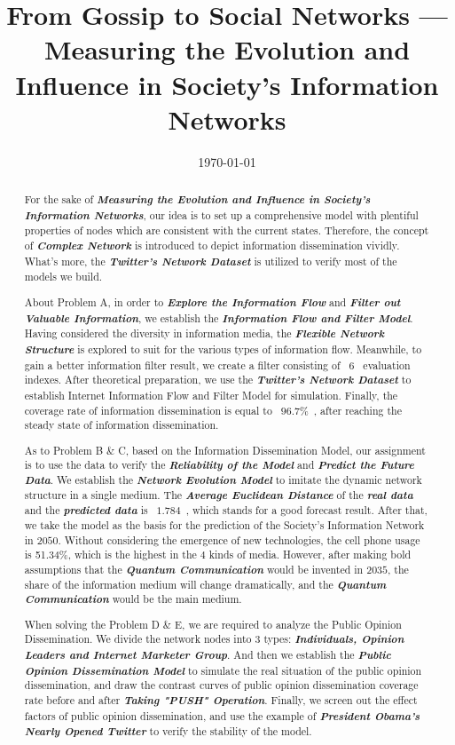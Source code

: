 \documentclass[a4paper,11pt]{article}
\title{From Gossip to Social Networks --- Measuring the Evolution and Influence in Society's Information Networks}%
\date{\today}
\begin{document}
\begin{abstract}

\par For the sake of \textbf{\emph{Measuring the Evolution and Influence in Society's Information Networks}}, our idea is to set up a comprehensive model with plentiful properties of nodes which are consistent with the current states. Therefore, the concept of \textbf{\emph{Complex Network}} is introduced to depict information dissemination vividly. What's more, the \textbf{\emph{Twitter's Network Dataset}} is utilized to verify most of the models we build.


\par About Problem A, in order to \textbf{\emph{Explore the Information Flow}} and \textbf{\emph{Filter out Valuable Information}}, we establish the \textbf{\emph{Information Flow and Filter Model}}. Having considered the diversity in information media, the \textbf{\emph{Flexible Network Structure}} is explored to suit for the various types of information flow. Meanwhile, to gain a better information filter result, we create a filter consisting of ~$6$~ evaluation indexes. After theoretical preparation, we use the \textbf{\emph{Twitter's Network Dataset}} to establish Internet Information Flow and Filter Model for simulation. Finally, the coverage rate of information dissemination is equal to ~$96.7\%$~, after reaching the steady state of information dissemination.


\par As to Problem B \& C, based on the Information Dissemination Model, our assignment is to use the data to verify the \emph{\textbf{Reliability of the Model}} and \emph{\textbf{Predict the Future Data}}. We establish the \emph{\textbf{Network Evolution Model}} to imitate the dynamic network structure in a single medium. The \textbf{\emph{Average Euclidean Distance}} of the \textbf{\emph{real data}} and the \emph{\textbf{predicted data}} is ~$1.784$~, which stands for a good forecast result. After that, we take the model as the basis for the prediction of the Society's Information Network in $2050$. Without considering the emergence of new technologies, the cell phone usage is 51.34\%, which is the highest in the $4$ kinds of media. However, after making bold assumptions that the \emph{\textbf{Quantum Communication}} would be invented in $2035$, the share of the information medium will change dramatically, and the \emph{\textbf{Quantum Communication }} would be the main medium.

\par  When solving the Problem D \& E, we are required to analyze the Public Opinion Dissemination. We divide the network nodes into $3$ types: \textbf{\emph{Individuals, Opinion Leaders and Internet Marketer Group}}. And then we establish the \emph{\textbf{Public Opinion Dissemination Model}} to simulate the real situation of the public opinion dissemination, and draw the contrast curves of public opinion dissemination coverage rate before and after \textbf{\emph{Taking "PUSH" Operation}}. Finally, we screen out the effect factors of public opinion dissemination, and use the example of \textbf{\emph{President Obama's Nearly Opened Twitter}} to verify the stability of the model.



\end{abstract}
\end{document}
